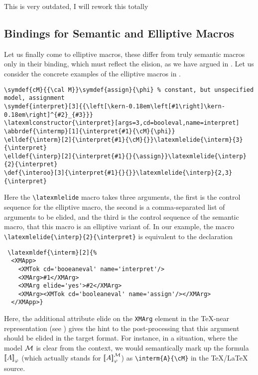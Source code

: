 \begin{oldpart}{This is very outdated, I will rework this totally}
\subsection{{\latexml} Bindings for Semantic and Elliptive Macros}

Let us finally come to elliptive macros, these differ from truly semantic macros
only in their {\latexml} binding, which must reflect the elision, as we have
argued in {}. Let us consider the concrete examples of the
elliptive macros in {}. 

\begin{footnotesize}
\begin{verbatim}
\symdef{cM}{{\cal M}}\symdef{assign}{\phi} % constant, but unspecified model, assignment
\symdef{interpret}[3]{{\left[\kern-0.18em\left[#1\right]\kern-0.18em\right]^{#2}_{#3}}}
\latexmlconstructor{\interpret}[args=3,cd=booleval,name=interpret]
\abbrdef{\intermp}[1]{\interpret{#1}{\cM}{\phi}}
\elldef{\interm}[2]{\interpret{#1}{\cM}{}}\latexmlelide{\interm}{3}{\interpret}
\elldef{\interp}[2]{\interpret{#1}{}{\assign}}\latexmlelide{\interp}{2}{\interpret}
\def{\interoo}[3]{\interpret{#1}{}{}}\latexmlelide{\interp}{2,3}{\interpret}
\end{verbatim}
\end{footnotesize}
Here the {\verb|\latexmlelide|} macro takes three arguments, the first is the
control sequence for the elliptive macro, the second is a comma-separated list of
arguments to be elided, and the third is the control sequence of the semantic
macro, that this macro is an elliptive variant of. In our example, the macro
{\verb|\latexmlelide{\interp}{2}{\interpret}|} is equivalent to the declaration
\begin{footnotesize}
\begin{verbatim}
 \latexmldef{\interm}[2]{%
  <XMApp>
    <XMTok cd='booeaneval' name='interpret'/>
    <XMArg>#1</XMArg>
    <XMArg elide='yes'>#2</XMArg>
    <XMArg><XMTok cd='booleaneval' name='assign'/></XMArg>
  </XMApp>}
\end{verbatim}
\end{footnotesize}
Here, the additional attribute elide on the {\tt{XMArg}} element in the
{\TeX}-near representation (see {}) gives the hint to the
post-processing that this argument should be elided in the target format. For
instance, in a situation, where the model ${\cal M}$ is clear from the context, we
would semantically mark up the formula ${\left[\kern-0.18em\left[A\right]\kern-0.18em\right]^{}_{\varphi}}$ (which actually stands for
${\left[\kern-0.18em\left[A\right]\kern-0.18em\right]^{{\cal M}}_{\varphi}}$) as {\verb|\interm{A}{\cM}|} in the {\TeX/\LaTeX} source.

\end{oldpart}

